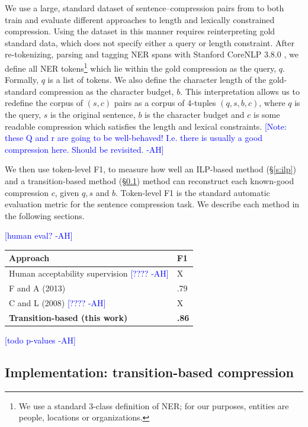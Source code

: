 \documentclass[11pt,a4paper]{article}
\newcommand{\ahcomment}[1]{\textcolor{blue}{[#1 -AH]}}
\begin{document}
We use a large, standard dataset of sentence--compression pairs from \citet{filippova2013overcoming} to both train and evaluate different approaches to length and lexically constrained compression. Using the dataset in this manner requires reinterpreting gold standard data, which does not specify either a query or length constraint. After re-tokenizing, parsing and tagging NER spans with Stanford CoreNLP 3.8.0 \cite{corenlp}, we define all NER tokens\footnote{We use a standard 3-class definition of NER; for our purposes, entities are people, locations or organizations.} which lie within the gold compression as the query, $q$. Formally, $q$ is a list of tokens. We also define the character length of the gold-standard compression as the character budget, $b$. This interpretation allows us to redefine the corpus of $(s,c)$ pairs as a corpus of 4-tuples $(q,s,b,c)$, where $q$ is the query, $s$ is the original sentence, $b$ is the character budget and $c$ is some readable compression which satisfies the length and lexical constraints.  \ahcomment{Note: these Q and r are going to be well-behaved! I.e. there is usually a good compression here. Should be revisited.}

We then use token-level F1, to measure how well an ILP-based method (\S\ref{s:ilp}) and a transition-based method (\S\ref{s:transition}) method can reconstruct each known-good compression $c$, given $q,s$ and $b$. Token-level F1 is the standard automatic evaluation metric for the sentence compression task. We describe each method in the following sections.

\ahcomment{human eval?}
    
\begin{table}[htb!]
\begin{tabular}{ll}
\centering
Approach & F1  \\ \hline
Human acceptability supervision \ahcomment{????}        &  X        \\
F and A (2013)    & .79           \\
C and L (2008)  \ahcomment{????}  & X      \\
\textbf{Transition-based (this work)} &  \textbf{.86}    \\   
\end{tabular}
\end{table}

\ahcomment{todo p-values}


\subsection{Implementation: transition-based compression}\label{s:transition}
\end{document}
